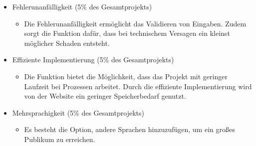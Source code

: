 \documentclass[11pt,a4paper]{report}
\begin{document}
\begin{itemize}
  \item
  Fehlerunanfälligkeit (5\% des Gesamtprojekts)

  \begin{itemize}
  \item
    Die Fehlerunanfälligkeit ermöglicht das Validieren von Eingaben. Zudem sorgt die Funktion 			dafür, dass bei technischem Versagen ein kleinst möglicher Schaden entsteht.
  \end{itemize}
  
\item
  Effiziente Implementierung (5\% des Gesamtprojekts)

  \begin{itemize}
  \item
    Die Funktion bietet die Möglichkeit, dass das Projekt mit geringer Laufzeit bei
    Prozessen arbeitet. Durch die effiziente Implementierung wird von der Website ein geringer 			Speicherbedarf genutzt. 
  \end{itemize}
  \item
  Mehrsprachigkeit (5\% des Gesamtprojekts)

  \begin{itemize}
  \item
    Es besteht die Option, andere Sprachen hinzuzufügen, um ein großes Publikum zu
    erreichen.
  \end{itemize}
  
\end{itemize}
\end{document}
